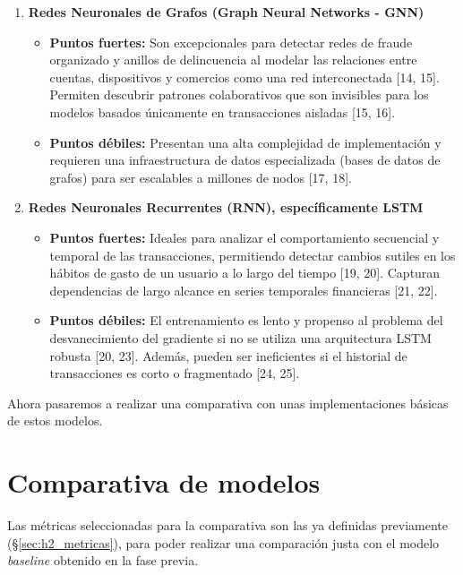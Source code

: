 \documentclass[12pt,a4paper]{report}
\begin{document}
\begin{enumerate}
    \item \textbf{Redes Neuronales de Grafos (Graph Neural Networks - GNN)}
    \begin{itemize}
        \item \textbf{Puntos fuertes:} Son excepcionales para detectar redes de fraude organizado y anillos de delincuencia al modelar las relaciones entre cuentas, dispositivos y comercios como una red interconectada [14, 15]. Permiten descubrir patrones colaborativos que son invisibles para los modelos basados únicamente en transacciones aisladas [15, 16].
        \item \textbf{Puntos débiles:} Presentan una alta complejidad de implementación y requieren una infraestructura de datos especializada (bases de datos de grafos) para ser escalables a millones de nodos [17, 18].
    \end{itemize}

    \item \textbf{Redes Neuronales Recurrentes (RNN), específicamente LSTM}
    \begin{itemize}
        \item \textbf{Puntos fuertes:} Ideales para analizar el comportamiento secuencial y temporal de las transacciones, permitiendo detectar cambios sutiles en los hábitos de gasto de un usuario a lo largo del tiempo [19, 20]. Capturan dependencias de largo alcance en series temporales financieras [21, 22].
        \item \textbf{Puntos débiles:} El entrenamiento es lento y propenso al problema del desvanecimiento del gradiente si no se utiliza una arquitectura LSTM robusta [20, 23]. Además, pueden ser ineficientes si el historial de transacciones es corto o fragmentado [24, 25].
    \end{itemize}



\end{enumerate}

Ahora pasaremos a realizar una comparativa con unas implementaciones básicas de estos modelos.

\section{Comparativa de modelos}
\label{sec:h3_comparativa}

Las métricas seleccionadas para la comparativa son las ya definidas previamente (\S\ref{sec:h2_metricas}), para poder realizar una comparación justa con el modelo \textit{baseline} obtenido en la fase previa.
\end{document}
